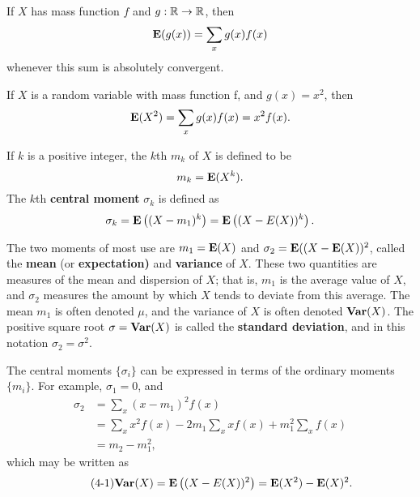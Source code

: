 \begin{lemma}
If $X$ has mass function $f$ and $g:\mathbb{R}\to\mathbb{R}$, then
\begin{equation*}
    \mathbf{E}(g(x)) = \sum_x g(x) f(x)
\end{equation*}
whenever this sum is absolutely convergent.
\end{lemma}

\begin{example}
If $X$ is a random variable with mass function f, and $g(x) = x^2$, then 
\begin{equation*}
    \mathbf{E}(X^2) = \sum_x g(x)f(x) = x^2 f(x).
\end{equation*}
\end{example}

\begin{definition}
If $k$ is a positive integer, the $k$th  $m_k$ of $X$ is defined to be 
\begin{equation*}
    m_k = \mathbf{E}(X^k).
\end{equation*}
The $k$th \textbf{central moment} $\sigma_k$ is defined as
\begin{equation*}
    \sigma_k = \mathbf{E}\left( (X-m_1)^k \right) = \mathbf{E}\left( (X-E(X))^k \right).
\end{equation*} 
\end{definition}

The two moments of most use are $m_1 = \mathbf{E}(X)$ and $\sigma_2 = \mathbf{E}( (X - \mathbf{E}(X))^2$, called the \textbf{mean} (or \textbf{expectation)} and \textbf{variance} of $X$. These two quantities are measures of the mean and dispersion of $X$; that is, $m_1$ is the average value of $X$, and $\sigma_2$ measures the amount by which $X$ tends to deviate from this average. The mean $m_1$ is often denoted $\mu$, and the variance of $X$ is often denoted $\mathbf{Var}(X)$. The positive square root $\sigma = \mathbf{Var}(X)$ is called the \textbf{standard deviation}, and in this notation $\sigma_2 = \sigma^2$. 

The central moments $\{\sigma_i\}$ can be expressed in terms of the ordinary moments $\{m_i\}$. For example, $\sigma_1 = 0$, and 
\begin{equation*}
    \begin{aligned} 
        \sigma_{2} &=\sum_{x}\left(x-m_{1}\right)^{2} f(x) \\ 
        &=\sum_{x} x^{2} f(x)-2 m_{1} \sum_{x} x f(x)+m_{1}^{2} \sum_{x} f(x) \\ 
        &=m_{2}-m_{1}^{2} ,
    \end{aligned}
\end{equation*}
which may be written as 
\begin{equation}
    \label{eq:4-1}
    \tag{4-1}
    \mathbf{Var}(X) = \mathbf{E}\left( (X-E(X))^2 \right) = \mathbf{E}(X^2) - \mathbf{E}(X)^2.
\end{equation}

